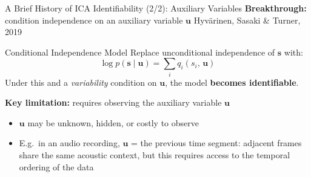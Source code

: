 \documentclass[aspectratio=169, 10pt]{beamer}
\begin{document}
\begin{frame}{A Brief History of ICA Identifiability (2/2): Auxiliary Variables}
  \textbf{Breakthrough:} condition independence on an auxiliary variable $\mathbf{u}$
  \hfill{\small Hyvärinen, Sasaki \& Turner, 2019}

  \bigskip
  \begin{block}{Conditional Independence Model}
    Replace unconditional independence of $\mathbf{s}$ with:
    \[
      \log p(\mathbf{s}\mid\mathbf{u}) = \sum_i q_i(s_i,\,\mathbf{u})
    \]
    Under this and a \emph{variability} condition on $\mathbf{u}$, the model
    \textbf{becomes identifiable}.
  \end{block}

  \bigskip
  \textbf{Key limitation:} requires observing the auxiliary variable $\mathbf{u}$
  \begin{itemize}
    \item $\mathbf{u}$ may be unknown, hidden, or costly to observe
    \item E.g.\ in an audio recording, $\mathbf{u}$ = the previous time segment:
          adjacent frames share the same acoustic context, but this requires
          access to the temporal ordering of the data
  \end{itemize}

\end{frame}
\end{document}
